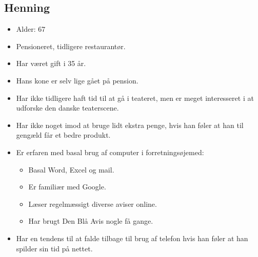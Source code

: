\subsection{Henning}
\begin{itemize}
    \item Alder: 67
    \item Pensioneret, tidligere restaurantør.
    \item Har været gift i 35 år.
    \item Hans kone er selv lige gået på pension.
    \item Har ikke tidligere haft tid til at gå i teateret, men er meget interesseret i at udforske den danske teaterscene.
    \item Har ikke noget imod at bruge lidt ekstra penge, hvis han føler at han til gengæld får et bedre produkt.
    \item Er erfaren med basal brug af computer i forretningsøjemed:
        \begin{itemize}
            \item Basal Word, Excel og mail.
            \item Er familiær med Google.
            \item Læser regelmæssigt diverse aviser online.
            \item Har brugt Den Blå Avis nogle få gange.
        \end{itemize}
    \item Har en tendens til at falde tilbage til brug af telefon hvis han føler at han spilder sin tid på nettet.
\end{itemize}
